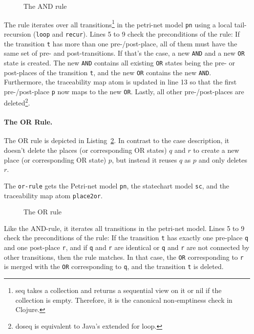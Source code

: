 \documentclass[submission]{eptcs}
\begin{document}
\begin{figure}[h!]
  
  \label{lst:and-rule}
  \caption{The AND rule}
\end{figure}

The rule iterates over all transitions\footnote{\textsf{seq} takes a collection
  and returns a sequential view on it or \textsf{nil} if the collection is
  empty.  Therefore, it is the canonical non-emptiness check in Clojure.} in
the petri-net model \verb|pn| using a local tail-recursion (\verb|loop| and
\verb|recur|).  Lines 5 to 9 check the preconditions of the rule: If the
transition \verb|t| has more than one pre-/post-place, all of them must have
the same set of pre- and post-transitions.  If that's the case, a new
\verb|AND| and a new \verb|OR| state is created.  The new \verb|AND| contains
all existing \verb|OR| states being the pre- or post-places of the transition
\verb|t|, and the new \verb|OR| contains the new \verb|AND|.  Furthermore, the
traceability map atom is updated in line 13 so that the first pre-/post-place
\verb|p| now maps to the new \verb|OR|.  Lastly, all other pre-/post-places are
deleted\footnote{\textsf{doseq} is equivalent to Java's extended \textsf{for}
  loop.}.


\paragraph{The OR Rule.}
\label{sec:or-rule}

The OR rule is depicted in Listing~\ref{lst:or-rule}.  In contrast to the case
description, it doesn't delete the places (or corresponding OR states) $q$ and
$r$ to create a new place (or corresponding OR state) $p$, but instead it
reuses $q$ as $p$ and only deletes $r$.

The \verb|or-rule| gets the Petri-net model \verb|pn|, the statechart model
\verb|sc|, and the traceability map atom \verb|place2or|.

\begin{figure}[h!t]
  
  \label{lst:or-rule}
  \caption{The OR rule}
\end{figure}

Like the AND-rule, it iterates all transitions in the petri-net model.  Lines 5
to 9 check the preconditions of the rule: If the transition \verb|t| has
exactly one pre-place \verb|q| and one post-place \verb|r|, and if \verb|q| and
\verb|r| are identical or \verb|q| and \verb|r| are not connected by other
transitions, then the rule matches.  In that case, the \verb|OR| corresponding
to \verb|r| is merged with the \verb|OR| corresponding to \verb|q|, and the
transition \verb|t| is deleted.
\end{document}
